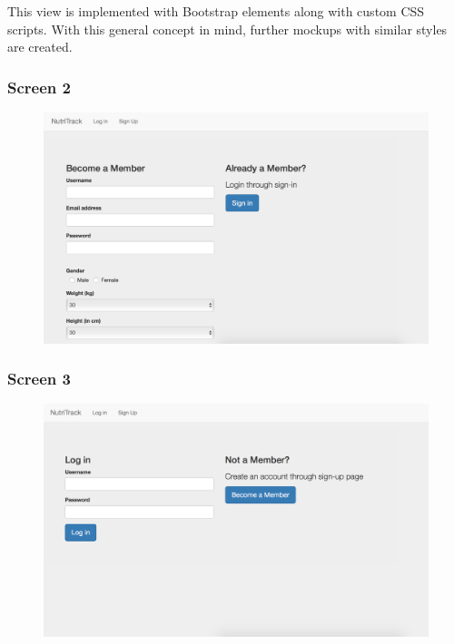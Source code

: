 This view is implemented with Bootstrap elements along with custom CSS
scripts. With this general concept in mind, further mockups with similar styles are created. 

\subsubsection{Screen 2}
\begin{figure}[H]
\centering
\includegraphics[scale=0.38]{3}
\end{figure}


\subsubsection{Screen 3}
\begin{figure}[H]
\centering
\includegraphics[scale=0.38]{4}
\end{figure}

